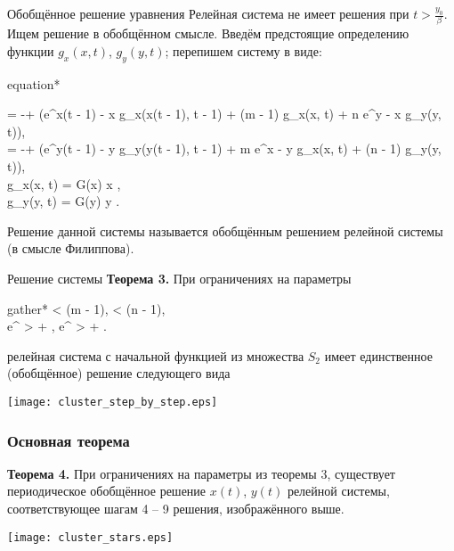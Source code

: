 \begin{frame}{Обобщённое решение уравнения}
	Релейная система не имеет решения при $t > \frac{y_0}{\beta}$. Ищем решение в обобщённом смысле. Введём предстоящие определению функции $g_x(x, t)$, $g_y(y, t)$; перепишем систему в виде:
	\footnotesize
	\begin{empheq}[box=\myeq]{equation*}
		\begin{cases}
			 = -\beta + \alpha \left(e^{x(t - 1) - x} g_x(x(t - 1), t - 1) + \delta (m - 1) g_x(x, t) + \delta n e^{y - x} g_y(y, t)\right),\\
			 = -\beta + \alpha \left(e^{y(t - 1) - y} g_y(y(t - 1), t - 1) + \delta m e^{x - y} g_x(x, t) + \delta (n - 1) g_y(y, t)\right),\\
			g_x(x, t) = G(x)  x ,\\
			g_y(y, t) = G(y)  y . 
		\end{cases}
	\end{empheq}
	\normalsize
		
	Решение данной системы называется обобщённым решением релейной системы (в смысле Филиппова).
	
\end{frame}

\begin{frame}{Решение системы}
	\textbf{Теорема 3.} При ограничениях на параметры
	\footnotesize
	\begin{empheq}[box=\myeq]{gather*}
		\label{eq:constraint_2}
		\beta < \alpha \delta (m - 1), \quad \beta < \alpha \delta (n - 1),\\
		\label{eq:constraint_3}
		e^{\beta} \cdot {} >  + , \quad
		e^{\beta} \cdot {} >  + .
	\end{empheq}
	\normalsize
	релейная система с начальной функцией из множества $S_2$ имеет единственное (обобщённое) решение следующего вида
	\begin{center}
	\texttt{[image: cluster\_step\_by\_step.eps]}
	\end{center}
\end{frame}


\begin{frame}
	\frametitle{Основная теорема}
	\textbf{Теорема 4.} При ограничениях на параметры из теоремы 3, существует периодическое обобщённое решение $x(t)$, $y(t)$ релейной системы, соответствующее шагам 4 -- 9 решения, изображённого выше.
	
	\begin{center}
		\texttt{[image: cluster\_stars.eps]}
	\end{center}
\end{frame}

